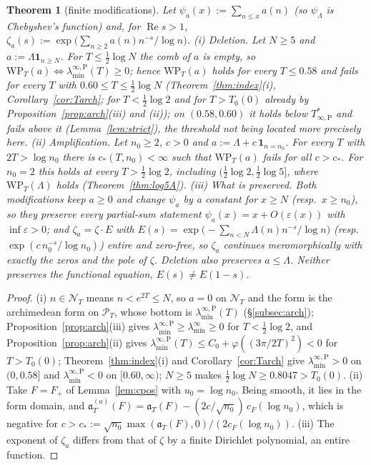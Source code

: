 \documentclass[11pt]{amsart}
\newtheorem{theorem}{Theorem}[section]
\theoremstyle{definition}
\theoremstyle{remark}
\newcommand{\Rel}{\operatorname{Re}}
\newcommand{\PT}{\mathcal P_T}
\newcommand{\cF}{c_F}
\newcommand{\NT}{\mathcal N_T}
\newcommand{\laminf}{\lambda^{\infty}_{\min}}
\newcommand{\laminfP}{\lambda^{\infty,\mathrm P}_{\min}}
\begin{document}
\begin{theorem}[finite modifications]\label{thm:finmod}
Let $\psi_a(x):=\sum_{n\le x}a(n)$ (so $\psi_\Lambda$ is Chebyshev's function) and, for $\Rel s>1$,
$\zeta_a(s):=\exp\big(\sum_{n\ge2}a(n)n^{-s}/\log n\big)$.
\emph{(i) Deletion.} Let $N\ge5$ and $a:=\Lambda\mathbf 1_{n\ge N}$. For $T\le\frac12\log N$ the comb of $a$ is
empty, so $\mathrm{WP}_T(a)\iff\laminfP(T)\ge0$; hence $\mathrm{WP}_T(a)$ holds for every $T\le0.58$
and fails for every $T$ with $0.60\le T\le\frac12\log N$ (Theorem~\ref{thm:index}(i), Corollary~\ref{cor:Tarch}; for $T<\frac12\log2$
and for $T>T_0(0)$ already by Proposition~\ref{prop:arch}(iii) and (ii)); on $(0.58,0.60)$ it holds below
$T^*_{\infty,\mathrm P}$ and fails above it (Lemma~\ref{lem:strict}), the threshold not being located more
precisely here.
\emph{(ii) Amplification.} Let $n_0\ge2$, $c>0$ and $a:=\Lambda+c\,\mathbf 1_{n=n_0}$. For every $T$ with
$2T>\log n_0$ there is $c_*(T,n_0)<\infty$ such that $\mathrm{WP}_T(a)$ fails for all $c>c_*$. For $n_0=2$
this holds at every $T>\frac12\log2$, including $(\frac12\log2,\frac12\log5]$, where $\mathrm{WP}_T(\Lambda)$ holds
(Theorem~\ref{thm:log5A}).
\emph{(iii) What is preserved.} Both modifications keep $a\ge0$ and change $\psi_a$ by a constant for
$x\ge N$ (resp.\ $x\ge n_0$), so they preserve every partial-sum statement $\psi_a(x)=x+O(\varepsilon(x))$
with $\inf\varepsilon>0$; and $\zeta_a=\zeta\cdot E$ with
$E(s)=\exp\big(-\sum_{n<N}\Lambda(n)n^{-s}/\log n\big)$ (resp.\ $\exp(c\,n_0^{-s}/\log n_0)$) entire and zero-free,
so $\zeta_a$ continues meromorphically with \emph{exactly the zeros and the pole of $\zeta$}. Deletion also
preserves $a\le\Lambda$. Neither preserves the functional equation, $E(s)\ne E(1-s)$.
\end{theorem}
\begin{proof}
(i) $n\in\NT$ means $n<e^{2T}\le N$, so $a=0$ on $\NT$ and the form is the archimedean form on $\PT$, whose
bottom is $\laminfP(T)$ (\S\ref{subsec:arch}); Proposition~\ref{prop:arch}(iii) gives
$\laminfP\ge\laminf\ge0$ for $T<\frac12\log2$, and Proposition~\ref{prop:arch}(ii) gives
$\laminfP(T)\le C_0+\varphi((3\pi/2T)^2)<0$ for $T>T_0(0)$; Theorem~\ref{thm:index}(i) and Corollary~\ref{cor:Tarch} give $\laminfP>0$ on
$(0,0.58]$ and $\laminfP<0$ on $[0.60,\infty)$; $N\ge5$ makes $\frac12\log N\ge0.8047>T_0(0)$.
(ii) Take $F=F_+$ of Lemma~\ref{lem:cpos} with $u_0=\log n_0$. Being smooth, it lies in the form domain,
and $\mathfrak a^{(a)}_T(F)=\mathfrak a_T(F)-(2c/\sqrt{n_0})\,\cF(\log n_0)$, which is negative for
$c>c_*:=\sqrt{n_0}\max(\mathfrak a_T(F),0)/(2\cF(\log n_0))$. (iii) The exponent of $\zeta_a$ differs from that
of $\zeta$ by a finite Dirichlet polynomial, an entire function.
\end{proof}
\end{document}
